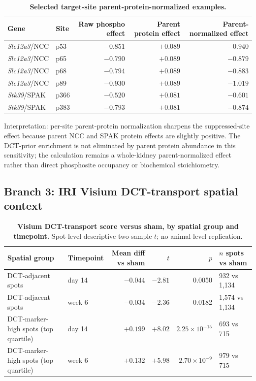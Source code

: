 \documentclass[10pt]{article}
\newcommand{\gene}[1]{\textit{#1}}
\begin{document}
\begin{table}[H]
\centering\small
\caption{\textbf{Selected target-site parent-protein-normalized examples.}}
\label{tab:occupancytarget}
\begin{tabular}{llrrr}
\toprule
Gene & Site & Raw phospho effect & Parent protein effect & Parent-normalized effect \\
\midrule
\gene{Slc12a3}/NCC & p53 & $-0.851$ & $+0.089$ & $-0.940$ \\
\gene{Slc12a3}/NCC & p65 & $-0.790$ & $+0.089$ & $-0.879$ \\
\gene{Slc12a3}/NCC & p68 & $-0.794$ & $+0.089$ & $-0.883$ \\
\gene{Slc12a3}/NCC & p89 & $-0.930$ & $+0.089$ & $-1.019$ \\
\gene{Stk39}/SPAK & p366 & $-0.520$ & $+0.081$ & $-0.601$ \\
\gene{Stk39}/SPAK & p383 & $-0.793$ & $+0.081$ & $-0.874$ \\
\bottomrule
\end{tabular}
\end{table}

\noindent
Interpretation: per-site parent-protein normalization sharpens the suppressed-site effect because parent NCC and SPAK protein effects are slightly positive. The DCT-prior enrichment is not eliminated by parent protein abundance in this sensitivity; the calculation remains a whole-kidney parent-normalized effect rather than direct phosphosite occupancy or biochemical stoichiometry.

\subsection{Branch 3: IRI Visium DCT-transport spatial context}

\begin{table}[H]
\centering\small
\caption{\textbf{Visium DCT-transport score versus sham, by spatial group and timepoint.} Spot-level descriptive two-sample $t$; no animal-level replication.}
\label{tab:dctxport}
\begin{tabularx}{\textwidth}{p{}lrrrX}
\toprule
Spatial group & Timepoint & Mean diff vs sham & $t$ & $p$ & $n$ spots vs sham \\
\midrule
DCT-adjacent spots & day 14 & $-0.044$ & $-2.81$ & 0.0050 & 932 vs 1{,}134 \\
DCT-adjacent spots & week 6 & $-0.034$ & $-2.36$ & 0.0182 & 1{,}574 vs 1{,}134 \\
DCT-marker-high spots (top quartile) & day 14 & $+0.199$ & $+8.02$ & $2.25\times10^{-15}$ & 693 vs 715 \\
DCT-marker-high spots (top quartile) & week 6 & $+0.132$ & $+5.98$ & $2.70\times10^{-9}$ & 979 vs 715 \\
\bottomrule
\end{tabularx}
\end{table}
\end{document}
